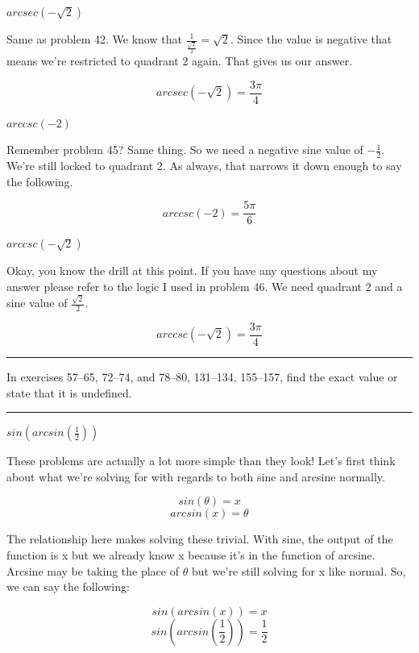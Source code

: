 \documentclass[10pt,letterpaper]{amspset}
\begin{document}
\begin{problem}[50]
    $arcsec(-\sqrt{2})$
\end{problem}

\begin{solution}
    Same as problem 42. We know that $\frac{1}{ \frac{\sqrt{2}}{2} } = \sqrt{2}$. Since the value is negative that means we're restricted to quadrant 2 again. That gives us our answer. 
    
    \[\boxed{ arcsec(-\sqrt{2}) = \frac{3\pi}{4}  }\]
\end{solution}


\begin{problem}[53]
    $arccsc(-2)$
\end{problem}

\begin{solution}
    Remember problem 45? Same thing. So we need a negative sine value of $-\frac{1}{2}$. We're still locked to quadrant 2. As always, that narrows it down enough to say the following.
    
    \[\boxed{ arccsc(-2) = \frac{5\pi}{6}  }\]
\end{solution}


\begin{problem}[54]
    $arccsc(-\sqrt{2})$
\end{problem}

\begin{solution}
    Okay, you know the drill at this point. If you have any questions about my answer please refer to the logic I used in problem 46. We need quadrant 2 and a sine value of $\frac{\sqrt{2}}{2}$. 
    
    \[\boxed{ arccsc(-\sqrt{2}) = \frac{3\pi}{4}   }\]
\end{solution}


\hrule \medskip

In exercises 57--65, 72--74, and 78--80, 131--134, 155--157, find the exact value or state that it is undefined. 

\medskip
\hrule

\begin{problem}[57]
    $sin \left(arcsin \left( \frac{1}{2} \right)\right)$
\end{problem}

\begin{solution}
    These problems are actually a lot more simple than they look! Let's first think about what we're solving for with regards to both sine and arcsine normally.
    
    \[ sin(\theta) = x \]
    \[ arcsin(x) = \theta \]
    
    The relationship here makes solving these trivial. With sine, the output of the function is x but we already know x because it's in the function of arcsine. Arcsine may be taking the place of $\theta$ but we're still solving for x like normal. So, we can say the following:
    
    \[ sin \left(arcsin \left( x \right)\right) = x\]
    \[\boxed{ sin \left(arcsin \left( \frac{1}{2} \right)\right) = \frac{1}{2} }\]
\end{solution}
\end{document}
